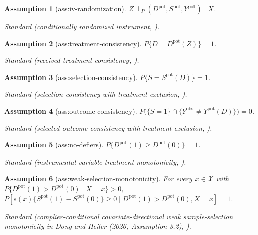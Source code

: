 \documentclass{article}
\newtheorem{assumption}{Assumption}
\begin{document}
\begin{assumption}[ass:iv-randomization]\label{ass:iv-randomization}
\(Z\perp_{P}(D^{\mathrm{pot}},S^{\mathrm{pot}},Y^{\mathrm{pot}})\mid X\).
\par\smallskip\noindent\emph{Standard} (conditionally randomized instrument, \cite{ChenFlores2015}).
\end{assumption}

\begin{assumption}[ass:treatment-consistency]\label{ass:treatment-consistency}
\(P\{D=D^{\mathrm{pot}}(Z)\}=1\).
\par\smallskip\noindent\emph{Standard} (received-treatment consistency, \cite{ChenFlores2015}).
\end{assumption}

\begin{assumption}[ass:selection-consistency]\label{ass:selection-consistency}
\(P\{S=S^{\mathrm{pot}}(D)\}=1\).
\par\smallskip\noindent\emph{Standard} (selection consistency with treatment exclusion, \cite{ChenFlores2015}).
\end{assumption}

\begin{assumption}[ass:outcome-consistency]\label{ass:outcome-consistency}
\(P\bigl(\{S=1\}\cap\{Y^{\mathrm{obs}}\ne Y^{\mathrm{pot}}(D)\}\bigr)=0\).
\par\smallskip\noindent\emph{Standard} (selected-outcome consistency with treatment exclusion, \cite{ChenFlores2015}).
\end{assumption}

\begin{assumption}[ass:no-defiers]\label{ass:no-defiers}
\(P\{D^{\mathrm{pot}}(1)\ge D^{\mathrm{pot}}(0)\}=1\).
\par\smallskip\noindent\emph{Standard} (instrumental-variable treatment monotonicity, \cite{ChenFlores2015}).
\end{assumption}

\begin{assumption}[ass:weak-selection-monotonicity]\label{ass:weak-selection-monotonicity}
For every \(x\in\mathcal X\) with \(P\{D^{\mathrm{pot}}(1)>D^{\mathrm{pot}}(0)\mid X=x\}>0\), \(P[s(x)\{S^{\mathrm{pot}}(1)-S^{\mathrm{pot}}(0)\}\ge0\mid D^{\mathrm{pot}}(1)>D^{\mathrm{pot}}(0),X=x]=1\).
\par\smallskip\noindent\emph{Standard} (complier-conditional covariate-directional weak sample-selection monotonicity in Dong and Heiler (2026, Assumption 3.2), \cite{DongHeiler2026}).
\end{assumption}
\end{document}
